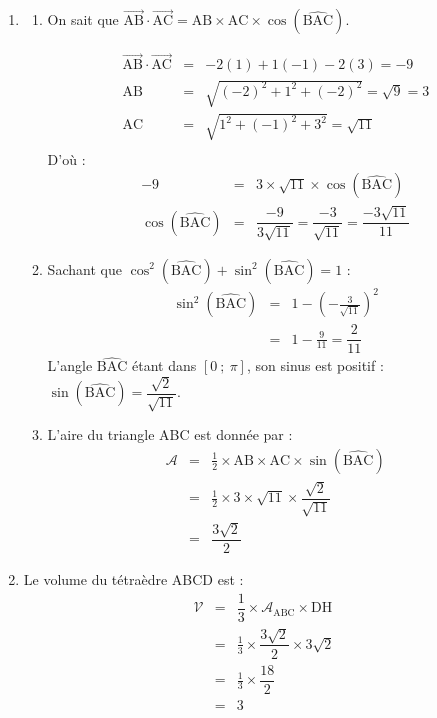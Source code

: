\documentclass[10pt]{article}
\providecommand{\vect}[1]{\overrightarrow{#1}}
\begin{document}
\begin{enumerate}
\item 
\begin{enumerate}
\item On sait que $\vect{\text{AB}} \cdot \vect{\text{AC}} = \text{AB} \times \text{AC} \times \cos(\widehat{\text{BAC}})$.

\[
\begin{array}{rcl}
\overrightarrow{\text{AB}} \cdot \overrightarrow{\text{AC}} &=& -2(1) + 1(-1) - 2(3) = -9 \\
\text{AB} &=& \sqrt{(-2)^2 + 1^2 + (-2)^2} = \sqrt{9} = 3 \\
\text{AC} &=& \sqrt{1^2 + (-1)^2 + 3^2} = \sqrt{11} \\
\end{array}
\]
D'où :
\[
\begin{array}{rcl}
-9 &=& 3 \times \sqrt{11} \times \cos(\widehat{\text{BAC}}) \\
\cos(\widehat{\text{BAC}}) &=& \dfrac{-9}{3\sqrt{11}} = \dfrac{-3}{\sqrt{11}} = \dfrac{-3\sqrt{11}}{11}
\end{array}
\]

\item Sachant que $\cos^2(\widehat{\text{BAC}}) + \sin^2(\widehat{\text{BAC}}) = 1$ :
\[
\begin{array}{rcl}
\sin^2(\widehat{\text{BAC}}) &=& 1 - \left(-\frac{3}{\sqrt{11}}\right)^2 \\
&=& 1 - \frac{9}{11} = \dfrac{2}{11}
\end{array}
\]
L'angle $\widehat{\text{BAC}}$ étant dans $[0~;~\pi]$, son sinus est positif : $\sin(\widehat{\text{BAC}}) = \dfrac{\sqrt{2}}{\sqrt{11}}$.

\item L'aire du triangle ABC est donnée par :
\[
\begin{array}{rcl}
\mathcal{A} &=& \frac{1}{2} \times \text{AB} \times \text{AC} \times \sin(\widehat{\text{BAC}}) \\
&=& \frac{1}{2} \times 3 \times \sqrt{11} \times \dfrac{\sqrt{2}}{\sqrt{11}} \\
&=& \dfrac{3\sqrt{2}}{2}
\end{array}
\]
\end{enumerate}

\item Le volume du tétraèdre ABCD est :
\[
\begin{array}{rcl}
\mathcal{V} &=& \dfrac{1}{3} \times \mathcal{A}_{\text{ABC}} \times \text{DH} \\
&=& \frac{1}{3} \times \dfrac{3\sqrt{2}}{2} \times 3\sqrt{2} \\
&=& \frac{1}{3} \times \dfrac{18}{2} \\
&=& 3
\end{array}
\]
\end{enumerate}
\end{document}
